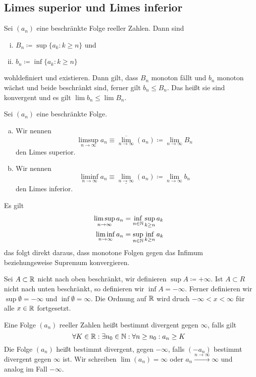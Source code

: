     \subsection{Limes superior und Limes inferior}
    Sei $(a_n)$ eine beschränkte Folge reeller Zahlen. Dann sind 
    \begin{enumerate}[(i)]
        \item $B_n \coloneqq \sup\{a_k : k\ge n\}$ und 
        \item $b_n \coloneqq \inf\{ a_k : k\ge n\}$ 
    \end{enumerate}
    wohldefiniert und existieren. Dann gilt, dass $B_n$ monoton fällt und $b_n$ monoton wächst und beide beschränkt sind, ferner gilt $b_n \le B_n$. Das heißt sie sind konvergent und es gilt $\lim b_n \le \lim B_n$.
    \begin{defn}
        Sei $(a_n)$ eine beschränkte Folge.
        \begin{enumerate}[(a)] 
            \item Wir nennen \[\limsup_{n\to \infty} a_n \equiv \overline{\lim_{n\to \infty}} (a_n) \coloneqq \lim_{n\to\infty} B_n\] den Limes superior.
            \item Wir nennen \[\liminf_{n\to \infty} a_n \equiv \underline{\lim_{n\to \infty}} (a_n) \coloneqq \lim_{n\to\infty} b_n\] den Limes inferior.
            
        \end{enumerate}
    \end{defn}
    \begin{bem}
        Es gilt \begin{align*}
            \limsup_{n\to \infty} a_n &= \inf_{n\in \mathbb{N}} \sup_{k\ge n} a_k \\
            \liminf_{n\to\infty} a_n &= \sup_{n\in \mathbb{N}} \inf_{k\ge n} a_k
        \end{align*}
        das folgt direkt daraus, dass monotone Folgen gegen das Infimum beziehungsweise Supremum konvergieren.
    \end{bem}
    \begin{defn}
        Sei $A\subset \mathbb{R}$ nicht nach oben beschränkt, wir definieren $\sup A\coloneqq +\infty$. Ist $A\subset R$ nicht nach unten beschränkt, so definieren wir $\inf A=-\infty$. Ferner definieren
        wir $\sup \emptyset = -\infty$ und $\inf \emptyset = \infty$. Die Ordnung auf $\mathbb{R}$ wird druch $-\infty < x< \infty$ für alle $x\in \mathbb{R}$ fortgesetzt.
    \end{defn}
    \begin{defn}
        Eine Folge $(a_n)$ reeller Zahlen heißt bestimmt divergent gegen $\infty$, falls gilt
        \[
        \forall K \in \mathbb{R}:\exists n_0 \in \mathbb{N}:\forall n\ge n_0 : a_n \ge K    
        \]
        Die Folge $(a_n)$ heißt bestimmt divergent, gegen $-\infty$, falls $(-a_n)$ bestimmt divergent gegen $\infty$ ist.
        Wir schreiben $\lim (a_n) = \infty$ oder $a_n \xrightarrow{n\to\infty} \infty$ und analog im Fall $-\infty$.
    \end{defn}
